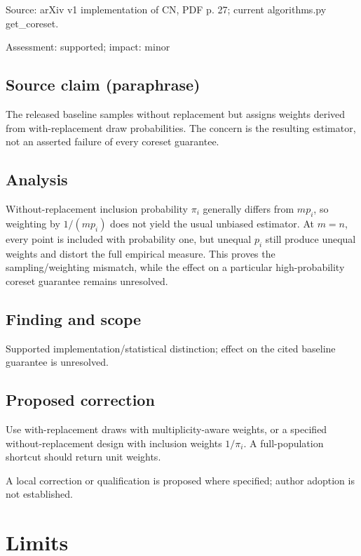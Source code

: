 \documentclass[11pt]{article}
\begin{document}
Source: arXiv v1 implementation of CN, PDF p. 27; current algorithms.py get\_coreset.

Assessment: supported; impact: minor

\subsection*{Source claim (paraphrase)}

The released baseline samples without replacement but assigns weights derived from with-replacement draw probabilities. The concern is the resulting estimator, not an asserted failure of every coreset guarantee.

\subsection*{Analysis}

Without-replacement inclusion probability \(\pi_i\) generally differs from \(mp_i\), so weighting by \(1/(mp_i)\) does not yield the usual unbiased estimator. At \(m=n\), every point is included with probability one, but unequal \(p_i\) still produce unequal weights and distort the full empirical measure. This proves the sampling/weighting mismatch, while the effect on a particular high-probability coreset guarantee remains unresolved.

\subsection*{Finding and scope}

Supported implementation/statistical distinction; effect on the cited baseline guarantee is unresolved.

\subsection*{Proposed correction}

Use with-replacement draws with multiplicity-aware weights, or a specified without-replacement design with inclusion weights \(1/\pi_i\). A full-population shortcut should return unit weights.

A local correction or qualification is proposed where specified; author adoption is not established.

\section*{Limits}
\end{document}
